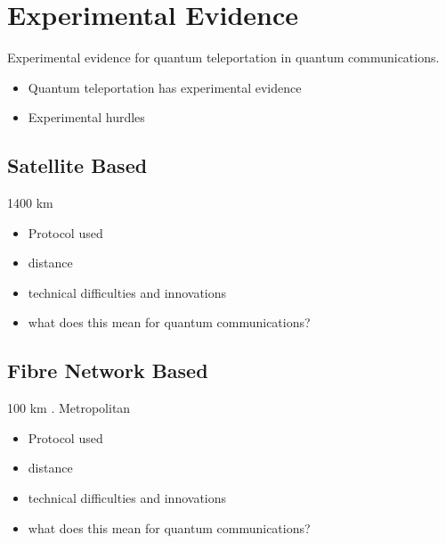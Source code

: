 \section{Experimental Evidence}
Experimental evidence for quantum teleportation in quantum communications.
\begin{itemize}
    \item Quantum teleportation has experimental evidence
    \item Experimental hurdles
\end{itemize}
\subsection{Satellite Based}
1400 km \cite{Ren:2017}
\begin{itemize}
    \item Protocol used
    \item distance
    \item technical difficulties and innovations
    \item what does this mean for quantum communications?
\end{itemize}

\subsection{Fibre Network Based}
100 km \cite{Takesue:2015}. Metropolitan \cite{Valivarthi:2016} 
\begin{itemize}
    \item Protocol used
    \item distance
    \item technical difficulties and innovations
    \item what does this mean for quantum communications?
\end{itemize}